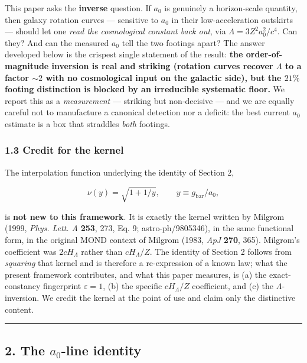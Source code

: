 \documentclass[
]{article}
\begin{document}
This paper asks the \textbf{inverse} question. If \(a_0\) is genuinely a
horizon-scale quantity, then galaxy rotation curves --- sensitive to
\(a_0\) in their low-acceleration outskirts --- should let one
\emph{read the cosmological constant back out}, via
\(\Lambda=3Z^2 a_0^2/c^4\). Can they? And can the measured \(a_0\) tell
the two footings apart? The answer developed below is the crispest
single statement of the result: \textbf{the order-of-magnitude inversion
is real and striking (rotation curves recover \(\Lambda\) to a factor
\(\sim2\) with no cosmological input on the galactic side), but the
\(21\%\) footing distinction is blocked by an irreducible systematic
floor.} We report this as a \emph{measurement} --- striking but
non-decisive --- and we are equally careful not to manufacture a
canonical detection nor a deficit: the best current \(a_0\) estimate is
a box that straddles \emph{both} footings.

\subsubsection{1.3 Credit for the kernel}\label{credit-for-the-kernel}

The interpolation function underlying the identity of Section 2,

\[\nu(y)=\sqrt{1+1/y},\qquad y\equiv g_\mathrm{bar}/a_0,\]

is \textbf{not new to this framework}. It is exactly the kernel written
by Milgrom (1999, \emph{Phys. Lett. A} \textbf{253}, 273, Eq. 9;
astro-ph/9805346), in the same functional form, in the original MOND
context of Milgrom (1983, \emph{ApJ} \textbf{270}, 365). Milgrom's
coefficient was \(2cH_\Lambda\) rather than \(cH_\Lambda/Z\). The
identity of Section 2 follows from \emph{squaring} that kernel and is
therefore a re-expression of a known law; what the present framework
contributes, and what this paper measures, is (a) the exact-constancy
fingerprint \(\varepsilon=1\), (b) the specific \(cH_\Lambda/Z\)
coefficient, and (c) the \(\Lambda\)-inversion. We credit the kernel at
the point of use and claim only the distinctive content.

\begin{center}\rule{0.5\linewidth}{0.5pt}\end{center}

\subsection{\texorpdfstring{2. The \(a_0\)-line
identity}{2. The a\_0-line identity}}\label{the-a_0-line-identity}
\end{document}

